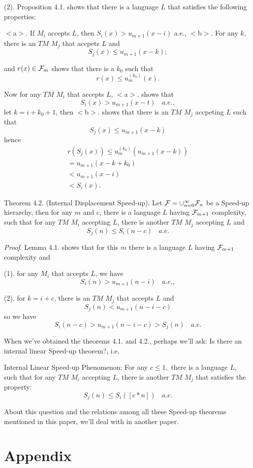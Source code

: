 (2). Proposition 4.1. shows that there is a language $L$ that
satisfies the following properties:

$<$a$>$. If $M_i$ accepts $L$, then $S_i(x)>u_{m+1}(x-i)$ a.e.,
$<$b$>$. For any $k$, there is an $TM$ $M_j$ that accpets $L$ and
$$S_j(x)\le u_{m+1}(x-k);$$


and $r(x)\in{\cal F}_m$ shows that there is a $k_0$ such that
$$r(x)\le u^{(k_0)}_m(x).$$

Now for any $TM$ $M_i$ that accepts $L$, $<$a$>$. shows that
$$S_i(x)>u_{m+1}(x-t)\ \ \ \ a.e.,$$
let $k=i+k_0+1$, then $<$b$>$. shows that there is an $TM$ $M_j$
accpeting $L$ such that
$$S_j(x)\le u_{m+1}(x-k)$$
hence
$$\begin{array}{l}   
r(S_j(x))\le u^{(k_0)}_m(u_{m+1}(x-k))\\
=u_{m+1}(x-k+k_0)\\
<u_{m+1}(x-i)\\
<S_i(x).\end{array}$$

Theorem 4.2. (Internal Displacement Speed-up). Let ${\cal F}
=\cup^\infty_{n=0}{\cal F}_n$ be a Speed-up hierarchy, then for
any $m$ and $c$, there is a language $L$ having ${\cal F}_{m+1}$ 
complexity, such that for any $TM$ $M_i$ accepting $L$, there
is another $TM$ $M_j$ accepting $L$ and
$$S_j(n)\le S_i(n-c)\ \ \ \ a.e.$$

{\it Proof}. Lemma 4.1. shows that for this $m$ there is a language $L$
having ${\cal F}_{m+1}$ complexity and

(1). for any $M_i$ that accepts $L$, we have
$$S_i(n)>u_{m+1}(n-i)\ \ \ \ a.e.,$$

(2). for $k=i+c$, there is an $TM$ $M_j$ that accepts $L$ and
$$S_j(n)<u_{m+1}(n-i-c)$$
so we have
$$S_i(n-c)>u_{m+1}(n-i-c)>S_j(n)\ \ \ \ a.e.$$

When we've obtained the theorems 4.1. and 4.2., perhaps we'll ask: Is
there an internal linear Speed-up theorem?, i.e.

Internal Linear Speed-up Phenomenon: For any $c\le 1,$ there is a language $L$, such that for any $TM$
$M_i$ accepting $L$, there is another $TM$ $M_j$ that
satisfies the property:
$$S_j(n)\le S_i([c*n])\ \ \ \ a.e.$$

About this question and the relations 
among all these Speed-up 
theorems mentioned in this paper, 
we'll deal with in another paper.

\section{Appendix}

